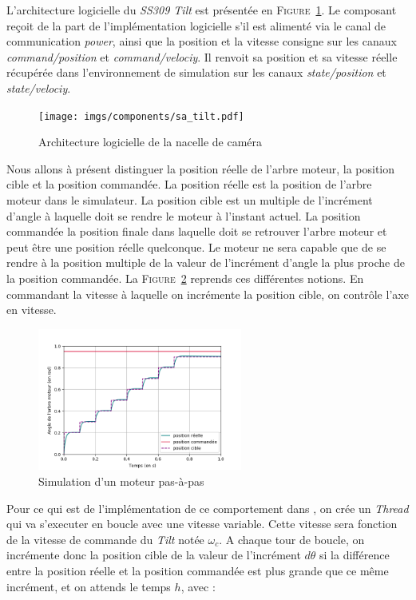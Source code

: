 				L'architecture logicielle du \textit{SS309 Tilt} est présentée en \textsc{Figure}~\ref{fig:sa_tilt}. Le composant reçoit de la part de l'implémentation logicielle s'il est alimenté via le canal de communication \textit{power}, ainsi que la position et la vitesse consigne sur les canaux \textit{command/position} et \textit{command/velociy}. Il renvoit sa position et sa vitesse réelle récupérée dans l'environnement de simulation sur les canaux \textit{state/position} et \textit{state/velociy}.

				\begin{figure}[!htb]
					\centering
					\texttt{[image: imgs/components/sa\_tilt.pdf]}
					\caption{Architecture logicielle de la nacelle de caméra}
					\label{fig:sa_tilt}
				\end{figure}

				Nous allons à présent distinguer la position réelle de l'arbre moteur, la position cible et la position commandée. La position réelle est la position de l'arbre moteur dans le simulateur. La position cible est un multiple de l'incrément d'angle à laquelle doit se rendre le moteur à l'instant actuel. La position commandée la position finale dans laquelle doit se retrouver l'arbre moteur et peut être une position réelle quelconque. Le moteur ne sera capable que de se rendre à la position multiple de la valeur de l'incrément d'angle la plus proche de la position commandée. La \textsc{Figure}~\ref{fig:tilt_position} reprends ces différentes notions. En commandant la vitesse à laquelle on incrémente la position cible, on contrôle l'axe en vitesse.

				\begin{figure}[!htb]
					\centering
					\includegraphics[width=0.6\textwidth]{imgs/stepper_motor.png}
					\caption{Simulation d'un moteur pas-à-pas}
					\label{fig:tilt_position}
				\end{figure}
				
				Pour ce qui est de l'implémentation de ce comportement dans \gazebo{}, on crée un \textit{Thread} qui va s'executer en boucle avec une vitesse variable. Cette vitesse sera fonction de la vitesse de commande du \textit{Tilt} notée $\omega_c$. A chaque tour de boucle, on incrémente donc la position cible de la valeur de l'incrément $d\theta$ si la différence entre la position réelle et la position commandée est plus grande que ce même incrément, et on attends le temps $h$, avec :

